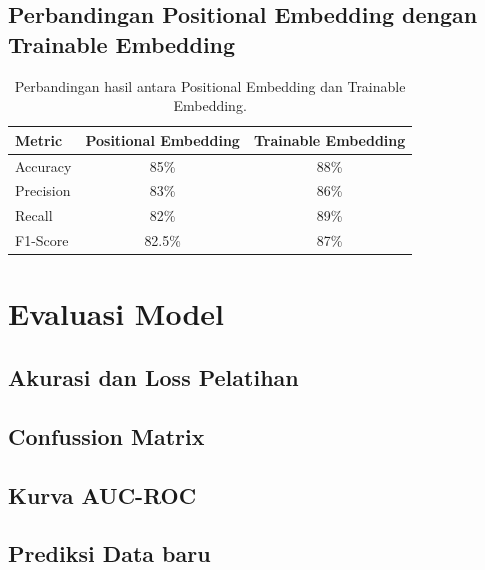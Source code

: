 \subsection{Perbandingan Positional Embedding dengan Trainable Embedding}
\begin{table}[H]
    \centering
    \caption{Perbandingan hasil antara Positional Embedding dan Trainable Embedding.}
    \begin{tabular}{lcc}
        \hline
        \textbf{Metric} & \textbf{Positional Embedding} & \textbf{Trainable Embedding} \\
        \hline
        Accuracy        & 85\%                          & 88\%                         \\
        Precision       & 83\%                          & 86\%                         \\
        Recall          & 82\%                          & 89\%                         \\
        F1-Score        & 82.5\%                        & 87\%                         \\
        \hline
    \end{tabular}
    \label{tab:embedding_comparison}
\end{table}
\section{Evaluasi Model}
\subsection{Akurasi dan Loss Pelatihan}

\subsection{Confussion Matrix}

\subsection{Kurva AUC-ROC}

\subsection{Prediksi Data baru}